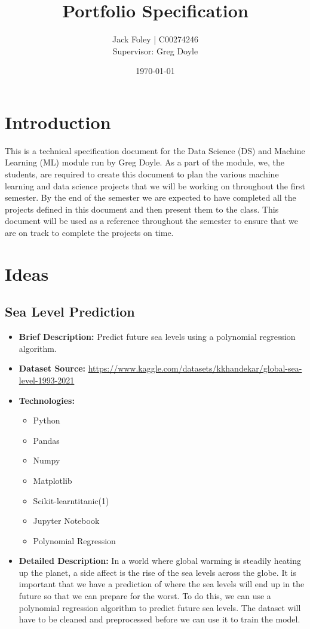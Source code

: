 \documentclass{article}
\title{Portfolio Specification}
\author{Jack Foley | C00274246 \\[1cm]Supervisor: Greg Doyle}
\date{\today}
\begin{document}
\maketitle

\newpage

\tableofcontents

\newpage

\section{Introduction}
This is a technical specification document for the Data Science (DS) and Machine Learning (ML) 
module run by Greg Doyle. As a part of the module, we, the students, are required to 
create this document to plan the various machine learning and data science projects 
that we will be working on throughout the first semester. By the end of the semester
we are expected to have completed all the projects defined in this document and then
present them to the class. This document will be used as a reference throughout the
semester to ensure that we are on track to complete the projects on time. 

\section{Ideas}

\subsection{Sea Level Prediction}

\begin{itemize}
    \item \textbf{Brief Description:} Predict future sea levels using a polynomial regression algorithm.
    \item \textbf{Dataset Source:} \href{https://www.kaggle.com/datasets/kkhandekar/global-sea-level-1993-2021}{https://www.kaggle.com/datasets/kkhandekar/global-sea-level-1993-2021} 
    \item \textbf{Technologies:}
    \begin{itemize}
        \item Python
        \item Pandas
        \item Numpy
        \item Matplotlib
        \item Scikit-learntitanic(1)
        \item Jupyter Notebook
        \item Polynomial Regression
    \end{itemize}
    \item \textbf{Detailed Description:} In a world where global warming is steadily heating up the planet, a side affect is the rise of the sea levels across the globe. 
    It is important that we have a prediction of where the sea levels will end up in the future so that we can prepare for the worst. To do this, we can use a polynomial 
    regression algorithm to predict future sea levels. The dataset will have to be cleaned and preprocessed before we can use it to train the model.
\end{itemize}
\end{document}
